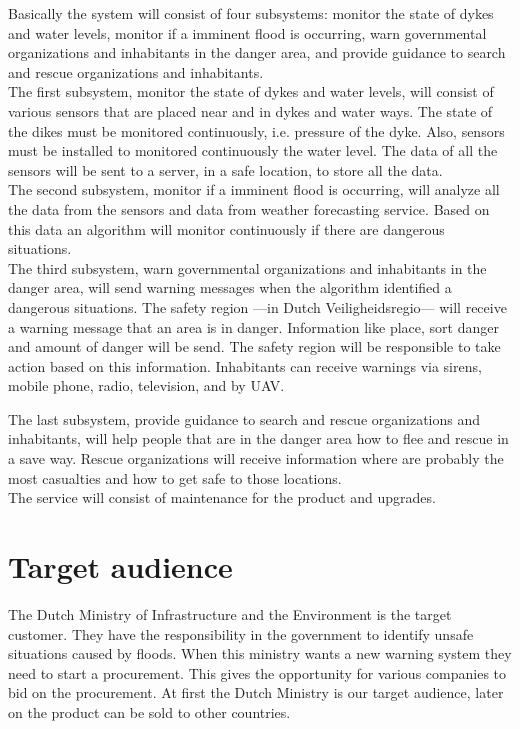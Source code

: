 Basically the system will consist of four subsystems: monitor the state of dykes and water levels, monitor if a imminent flood is occurring, warn governmental organizations and inhabitants in the danger area, and provide guidance to search and rescue organizations and inhabitants.\\

The first subsystem, monitor the state of dykes and water levels, will consist of various sensors that are placed near and in dykes and water ways. The state of the dikes must be monitored continuously, i.e. pressure of the dyke. Also, sensors must be installed to monitored continuously the water level. The data of all the sensors will be sent to a server, in a safe location, to store all the data.\\

The second subsystem, monitor if a imminent flood is occurring, will analyze all the data from the sensors and data from weather forecasting service. Based on this data an algorithm will monitor continuously if there are dangerous situations.\\

The third subsystem, warn governmental organizations and inhabitants in the danger area, will send warning messages when the algorithm identified a dangerous situations. The safety region ---in Dutch Veiligheidsregio--- will receive a warning message that an area is in danger. Information like place, sort danger and amount of danger will be send. The safety region will be responsible to take action based on this information. Inhabitants can receive warnings via sirens, mobile phone, radio, television, and by UAV.

The last subsystem, provide guidance to search and rescue organizations and inhabitants, will help people that are in the danger area how to flee and rescue in a save way. Rescue organizations will receive information where are probably the most casualties and how to get safe to those locations.\\


The service will consist of maintenance for the product and upgrades.

\section{Target audience}
The Dutch Ministry of Infrastructure and the Environment is the target customer. They have the responsibility in the government to identify unsafe situations caused by floods. When this ministry wants a new warning system they need to start a procurement. This gives the opportunity for various companies to bid on the procurement. At first the Dutch Ministry is our target audience, later on the product can be sold to other countries.


